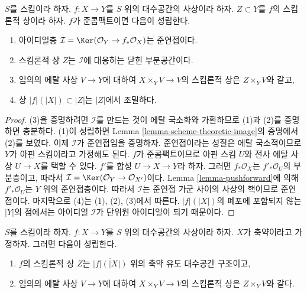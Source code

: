 \begin{lemma}
\label{lemma-quasi-compact-scheme-theoretic-image}
$S$를 스킴이라 하자.
$f : X \to Y$를 $S$ 위의 대수공간의 사상이라 하자.
$Z \subset Y$를 $f$의 스킴론적 상이라 하자.
$f$가 준콤팩트이면 다음이 성립한다.
\begin{enumerate}
\item 아이디얼층
$\mathcal{I} = \Ker(\mathcal{O}_Y \to f_*\mathcal{O}_X)$는 준연접이다.
\item 스킴론적 상 $Z$는 $\mathcal{I}$에 대응하는 닫힌 부분공간이다.
\item 임의의 에탈 사상 $V \to Y$에 대하여
$X \times_Y V \to V$의 스킴론적 상은 $Z \times_Y V$와 같고,
\item 상 $|f|(|X|) \subset |Z|$는 $|Z|$에서 조밀하다.
\end{enumerate}
\end{lemma}

\begin{proof}
(3)을 증명하려면 $\mathcal{I}$를 만드는 것이 에탈 국소화와
가환하므로 (1)과 (2)를 증명하면 충분하다.
(1)이 성립하면 Lemma \ref{lemma-scheme-theoretic-image}의
증명에서 (2)를 보였다. 이제 $\mathcal{I}$가 준연접임을 증명하자.
준연접이라는 성질은 에탈 국소적이므로 $Y$가 아핀 스킴이라고
가정해도 된다. $f$가 준콤팩트이므로 아핀 스킴 $U$와
전사 에탈 사상 $U \to X$를 택할 수 있다.
$f'$를 합성 $U \to X \to Y$라 하자.
그러면 $f_*\mathcal{O}_X$는 $f'_*\mathcal{O}_U$의 부분층이고,
따라서 $\mathcal{I} = \Ker(\mathcal{O}_Y \to \mathcal{O}_{X'})$이다.
Lemma \ref{lemma-pushforward}에 의해
$f'_*\mathcal{O}_U$는 $Y$ 위의 준연접층이다. 따라서 $\mathcal{I}$는
준연접 가군 사이의 사상의 핵이므로 준연접이다.
마지막으로 (4)는 (1), (2), (3)에서 따른다. $|f|(|X|)$의
폐포에 포함되지 않는 $|Y|$의 점에서는 아이디얼 $\mathcal{I}$가
단위원 아이디얼이 되기 때문이다.
\end{proof}

\begin{lemma}
\label{lemma-scheme-theoretic-image-reduced}
$S$를 스킴이라 하자. $f : X \to Y$를 $S$ 위의 대수공간의
사상이라 하자. $X$가 축약이라고 가정하자. 그러면 다음이 성립한다.
\begin{enumerate}
\item $f$의 스킴론적 상 $Z$는 $\overline{|f|(|X|)}$ 위의
축약 유도 대수공간 구조이고,
\item 임의의 에탈 사상 $V \to Y$에 대하여
$X \times_Y V \to V$의 스킴론적 상은 $Z \times_Y V$와 같다.
\end{enumerate}
\end{lemma}

